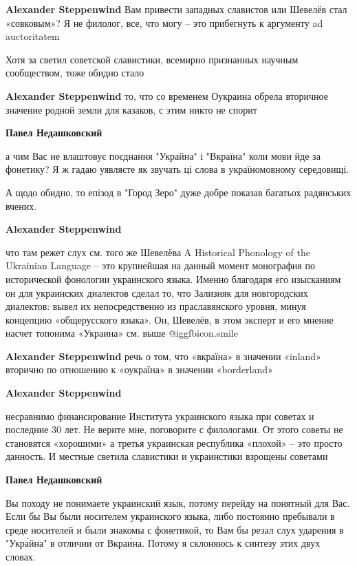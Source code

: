 \begin{itemize}
\begin{itemize}
\textbf{Alexander Steppenwind} Вам привести западных славистов или Шевелёв стал «совковым»? Я не филолог, все, что могу – это прибегнуть к аргументу ad auctoritatem

Хотя за светил советской славистики, всемирно признанных научным сообществом,
тоже обидно стало

\textbf{Alexander Steppenwind} то, что со временем Оукраина обрела вторичное значение родной земли для казаков, с этим никто не спорит

\textbf{Павел Недашковский} 

а чим Вас не влаштовує поєднання "Украйна" і "Вкраїна" коли мови йде за
фонетику? Я ж гадаю уявляєте як звучать ці слова в україномовному середовищі.

А щодо обидно, то епізод в "Город Зеро" дуже добре показав багатьох радянських
вчених.

\textbf{Alexander Steppenwind} 

что там режет слух см. того же Шевелёва A Historical Phonology of the Ukrainian
Language – это крупнейшая на данный момент монография по исторической фонологии
украинского языка. Именно благодаря его изысканиям он для украинских диалектов
сделал то, что Зализняк для новгородских диалектов: вывел их непосредственно из
праславянского уровня, минуя концепцию «общерусского языка». Он, Шевелёв, в
этом эксперт и его мнение насчет топонима «Украина» см. выше  @igg{fbicon.smile} 

\textbf{Alexander Steppenwind} речь о том, что «вкраїна» в значении «inland» вторично по отношению к «оукраїна» в значении «borderland»

\textbf{Alexander Steppenwind} 

несравнимо финансирование Института украинского языка при советах и последние
30 лет. Не верите мне, поговорите с филологами. От этого советы не становятся
«хорошими» а третья украинская республика «плохой» – это просто данность. И
местные светила славистики и украинстики взрощены советами

\textbf{Павел Недашковский} 

Вы походу не понимаете украинский язык, потому перейду на понятный для Вас.
Если бы Вы были носителем украинского языка, либо постоянно пребывали в среде
носителей и были знакомы с фонетикой, то Вам бы резал слух ударения в "Укра́йна"
в отличии от Вкраи́на. Потому я склоняюсь к синтезу этих двух словах.


\end{itemize}
\end{itemize}
